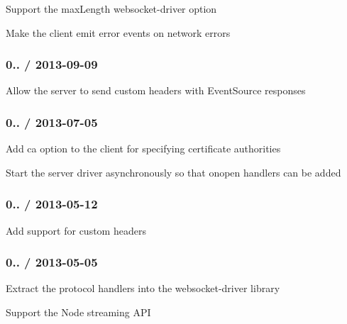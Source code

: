 \begin{DoxyItemize}
\item Support the {\ttfamily max\+Length} websocket-\/driver option
\item Make the client emit {\ttfamily error} events on network errors
\end{DoxyItemize}

\subsubsection*{0.. / 2013-\/09-\/09}


\begin{DoxyItemize}
\item Allow the server to send custom headers with Event\+Source responses
\end{DoxyItemize}

\subsubsection*{0.. / 2013-\/07-\/05}


\begin{DoxyItemize}
\item Add {\ttfamily ca} option to the client for specifying certificate authorities
\item Start the server driver asynchronously so that {\ttfamily onopen} handlers can be added
\end{DoxyItemize}

\subsubsection*{0.. / 2013-\/05-\/12}


\begin{DoxyItemize}
\item Add support for custom headers
\end{DoxyItemize}

\subsubsection*{0.. / 2013-\/05-\/05}


\begin{DoxyItemize}
\item Extract the protocol handlers into the {\ttfamily websocket-\/driver} library
\item Support the Node streaming A\+PI
\end{DoxyItemize}

